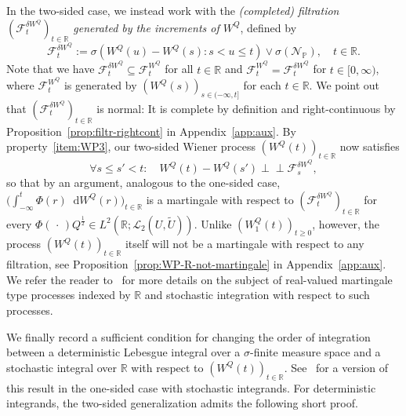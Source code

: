 \documentclass[reqno]{amsart}
\numberwithin{equation}{section}
\newcommand{\bbP}{\mathbb{P}}
\newcommand{\bbR}{\mathbb{R}}
\newcommand{\R}{\mathbb{R}}
\newcommand{\cF}{\mathcal{F}}
\newcommand{\cN}{\mathcal{N}}
\newcommand{\rd}{\mathop{}\!\mathrm{d}}
\newcommand{\ind}{\perp\!\!\!\perp}
\theoremstyle{remark}
\theoremstyle{definition}
\begin{document}
In the two-sided case, we instead work with the 
\emph{(completed) filtration $(\cF_t^{\delta W^Q})_{t\in\R}$ generated by the increments of $W^Q$},
defined by
%
\begin{equation}\label{eq:increment-filtration}
	\cF_t^{\delta W^Q} 
	:=
	\sigma (W^Q(u) - W^Q(s) :  s < u \le t ) \vee \sigma(\cN_{\bbP}),
	\quad
	t \in \R.
\end{equation}
%
Note that we have $\cF^{\delta W^Q}_t \subseteq \cF^{W^Q}_t$
for all $t \in \bbR$ and $\cF^{W^Q}_t = \cF^{\delta W^Q}_t$
for $t \in [0,\infty)$, where
$\cF^{W^Q}_t$ is generated
by $(W^Q(s))_{s\in(-\infty, t]}$ for each $t \in \bbR$.
We point out that $(\cF_t^{\delta W^Q})_{t\in\R}$ is normal:
It is complete by definition and
right-continuous by Proposition~\ref{prop:filtr-rightcont}
in Appendix~\ref{app:aux}.
By property~\ref{item:WP3},
our two-sided Wiener process $(W^Q(t))_{t\in \R}$ now satisfies
%
\begin{equation}\label{item:WP3prime}
	\tag{WP3$'$}
	\forall s \le s' < t : \quad  
	W^Q(t) - W^Q(s') \ind \cF_s^{\delta W^Q}\!,
\end{equation}
%
so that by an argument, 
analogous to the one-sided case, 
$\bigl( \int_{-\infty}^t \Phi(r) \rd W^Q(r) \bigr)_{t\in\bbR}$
is a martingale with respect to $(\cF_t^{\delta W^Q})_{t\in\R}$
for every $\Phi(\,\cdot\,)Q^\frac{1}{2} \in L^2(\bbR; \mathscr L_2(U, \widetilde U))$.
Unlike $(W_1^Q(t))_{t\geq 0}$, however, 
the process $(W^Q(t))_{t\in\R}$ itself will not be a martingale
with respect to any filtration, see  Proposition~\ref{prop:WP-R-not-martingale} in Appendix~\ref{app:aux}.
We refer the reader to~\cite{BOGP2010, BOGP2014} for more details on the subject of real-valued
martingale type processes indexed 
by $\bbR$ and stochastic integration
with respect to such processes.

We finally record a sufficient condition for 
changing the order of integration between a deterministic Lebesgue integral
over a $\sigma$-finite measure space and a stochastic integral over $\R$ with respect to $(W^Q(t))_{t\in \R}$.
See~\cite{vNV2006} for a version of this result in the one-sided case with stochastic integrands.
For deterministic integrands, the two-sided generalization admits the following short proof.
\end{document}
